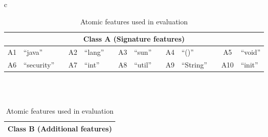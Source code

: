 \begin{table}[t]
     \centering	\scriptsize
    \caption{Atomic features used in evaluation}
    \label{tbl:features}
\begin{tabular}{c}
    \begin{tabular}{clcclcclcclccl}
        \toprule
        \multicolumn{14}{c}{Class A (Signature features)} \\
        \midrule
        A1 & ``java'' &\quad& A2 & ``lang'' &\quad& A3 & ``sun'' &\quad& A4 & ``()'' &\quad& A5 & ``void'' \\
        A6 & ``security'' &\quad& A7 & ``int''  &\quad&  A8 & ``util'' &\quad& A9 & ``String'' &\quad&  A10 & ``init'' \\
        \bottomrule
    \end{tabular}
\\
\\
    \begin{tabular}{clcl}
        \toprule
        \multicolumn{4}{c}{Class B (Additional features)} \\
        \midrule


\end{tabular}
\end{tabular}
\end{table}
